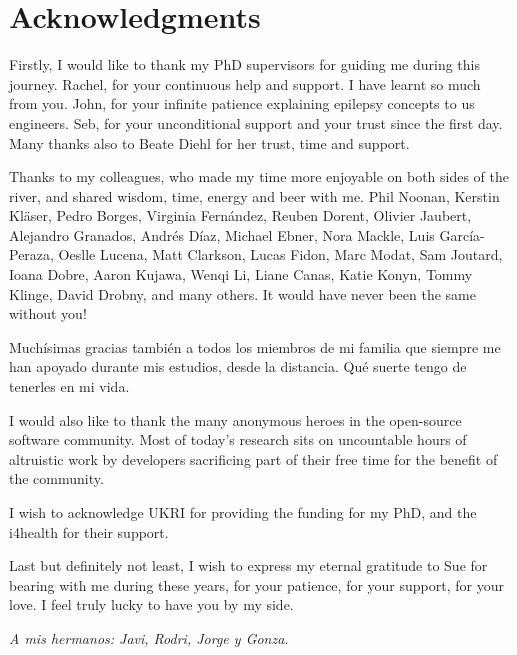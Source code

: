\chapter{Acknowledgments}

Firstly, I would like to thank my PhD supervisors for guiding me during this journey.
Rachel, for your continuous help and support.
I have learnt so much from you.
John, for your infinite patience explaining epilepsy concepts to us engineers.
Seb, for your unconditional support and your trust since the first day.
Many thanks also to Beate Diehl for her trust, time and support.

Thanks to my colleagues, who made my time more enjoyable on both sides of the river, and shared wisdom, time, energy and beer with me.
Phil Noonan, Kerstin Kläser, Pedro Borges, Virginia Fernández, Reuben Dorent, Olivier Jaubert, Alejandro Granados, Andrés Díaz, Michael Ebner, Nora Mackle, Luis García-Peraza, Oeslle Lucena, Matt Clarkson, Lucas Fidon, Marc Modat, Sam Joutard, Ioana Dobre, Aaron Kujawa, Wenqi Li, Liane Canas, Katie Konyn, Tommy Klinge, David Drobny, and many others. It would have never been the same without you!

Muchísimas gracias también a todos los miembros de mi familia que siempre me han apoyado durante mis estudios, desde la distancia.
Qué suerte tengo de tenerles en mi vida.

I would also like to thank the many anonymous heroes in the open-source software community.
Most of today's research sits on uncountable hours of altruistic work by developers sacrificing part of their free time for the benefit of the community.

I wish to acknowledge \ac{UKRI} for providing the funding for my PhD, and the \ac{i4health} for their support.

Last but definitely not least, I wish to express my eternal gratitude to Sue for bearing with me during these years, for your patience, for your support, for your love.
I feel truly lucky to have you by my side.

\clearpage
\begin{center}
    \thispagestyle{empty}
    \raggedleft
    \vspace*{\fill}
    \textit{A mis hermanos: Javi, Rodri, Jorge y Gonza.}
    \vspace*{\fill}
\end{center}
\clearpage
